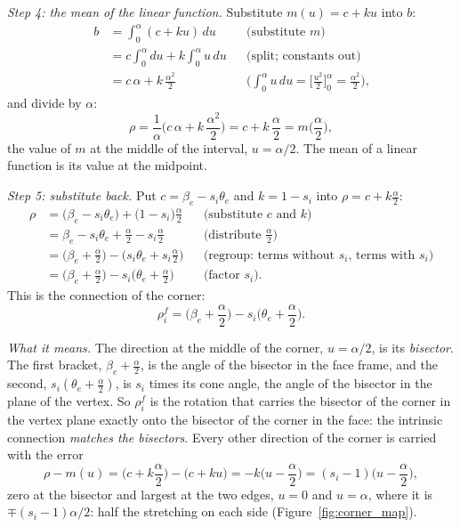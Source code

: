 \emph{Step 4: the mean of the linear function.} Substitute $m(u) = c + ku$ into $b$:
\begin{align*}
b &= \int_0^\alpha (c + k u)\, du && \text{(substitute $m$)} \\
&= c\int_0^\alpha du + k\int_0^\alpha u\, du && \text{(split; constants out)} \\
&= c\,\alpha + k\,\frac{\alpha^2}{2} && \text{($\textstyle\int_0^\alpha u\,du = \big[\tfrac{u^2}2\big]_0^\alpha = \tfrac{\alpha^2}{2}$),}
\end{align*}
and divide by $\alpha$:
\begin{equation*}
\rho = \frac{1}{\alpha}\Big(c\,\alpha + k\,\frac{\alpha^2}{2}\Big) = c + k\,\frac{\alpha}{2} = m\Big(\frac\alpha2\Big) ,
\end{equation*}
the value of $m$ at the middle of the interval, $u = \alpha/2$. The mean of a linear function is its value at the midpoint.

\emph{Step 5: substitute back.} Put $c = \beta_e - s_i\theta_e$ and $k = 1 - s_i$ into $\rho = c + k\frac\alpha2$:
\begin{align*}
\rho &= \big(\beta_e - s_i\theta_e\big) + \big(1 - s_i\big)\frac\alpha2 && \text{(substitute $c$ and $k$)} \\
&= \beta_e - s_i\theta_e + \frac\alpha2 - s_i\frac\alpha2 && \text{(distribute $\tfrac\alpha2$)} \\
&= \Big(\beta_e + \frac\alpha2\Big) - \Big(s_i\theta_e + s_i\frac\alpha2\Big) && \text{(regroup: terms without $s_i$, terms with $s_i$)} \\
&= \Big(\beta_e + \frac\alpha2\Big) - s_i\Big(\theta_e + \frac\alpha2\Big) && \text{(factor $s_i$).}
\end{align*}
This is the connection of the corner:
\begin{equation}
\label{eqn:intrinsic_rho}
\rho_i^f = \Big(\beta_e + \frac{\alpha}{2}\Big) - s_i \Big(\theta_e + \frac{\alpha}{2}\Big).
\end{equation}

\emph{What it means.} The direction at the middle of the corner, $u = \alpha/2$, is its \emph{bisector}. The first bracket, $\beta_e + \frac\alpha2$, is the angle of the bisector in the face frame, and the second, $s_i(\theta_e + \frac\alpha2)$, is $s_i$ times its cone angle, the angle of the bisector in the plane of the vertex. So $\rho_i^f$ is the rotation that carries the bisector of the corner in the vertex plane exactly onto the bisector of the corner in the face: the intrinsic connection \emph{matches the bisectors}. Every other direction of the corner is carried with the error
\begin{equation*}
\rho - m(u) = \Big(c + k\frac\alpha2\Big) - \big(c + ku\big) = -k\Big(u - \frac\alpha2\Big) = (s_i - 1)\Big(u - \frac\alpha2\Big),
\end{equation*}
zero at the bisector and largest at the two edges, $u = 0$ and $u = \alpha$, where it is $\mp (s_i - 1)\alpha/2$: half the stretching on each side (Figure~\ref{fig:corner_map}).


